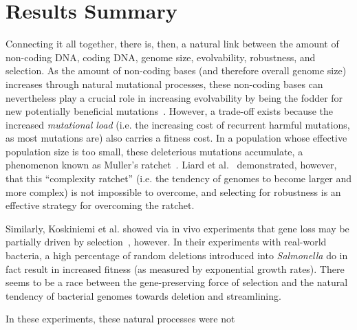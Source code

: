
\section{Results Summary}
Connecting it all together, there is, then, a natural link between the amount of non-coding DNA, coding DNA, genome size, evolvability, robustness, and selection. As the amount of non-coding bases (and therefore overall genome size) increases through natural mutational processes, these non-coding bases can nevertheless play a crucial role in increasing evolvability by being the fodder for new potentially beneficial mutations~\cite{Knibbe2007}. However, a trade-off exists because the increased \textit{mutational load} (i.e. the increasing cost of recurrent harmful mutations, as most mutations are) also carries a fitness cost. In a population whose effective population size is too small, these deleterious mutations accumulate, a phenomenon known as Muller's ratchet~\cite{MullersRatchet}. Liard et al.~\cite{Liard.2018} demonstrated, however, that this ``complexity ratchet'' (i.e. the tendency of genomes to become larger and more complex) is not impossible to overcome, and selecting for robustness is an effective strategy for overcoming the ratchet. 

Similarly, Koskiniemi et al. showed via in vivo experiments that gene loss may be partially driven by selection~\cite{koskiniemi2012}, however. In their experiments with real-world bacteria, a high percentage of random deletions introduced into \textit{Salmonella} do in fact result in increased fitness (as measured by exponential growth rates). There seems to be a race between the gene-preserving force of selection and the natural tendency of bacterial genomes towards deletion and streamlining. 

In these experiments, these natural processes were not  